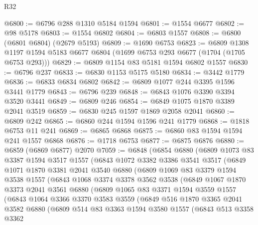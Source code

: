 \begin{lexlean}{R32}
\begin{coremodule}
@6800 := @6796 @288 @1310 @5184 @1594
@6801 := @1554 @6677
@6802 := @98 @5178
@6803 := @1554 @6802
@6804 := @6803 @1557
@6808 := @6800 (@6801 @6804) (@2679 @5193)
@6809 := @1690 @6753
@6823 := @6809
    @1308
    @1197
    @1594
    @5183
    @6677
    @6804
    (@1699 @6753 @293 @6677 (@1704 (@1705 @6753 @293)))
@6829 := @6809 @1154 @83 @5181 @1594 @6802 @1557
@6830 := @6796 @237
@6833 := @6830 @1153 @5175 @5180
@6834 := @3442 @1779
@6836 := @6833 @6834 @6802
@6842 := @6809 @1077 @244 @3395 @1596 @3441 @1779
@6843 := @6796 @239
@6848 := @6843 @1076 @3390 @3394 @3520 @3441
@6849 := @6809 @246
@6854 := @6849 @1075 @1870 @3389 @2041 @3519
@6859 := @6830 @245 @1597 @1869 @2058 @2041
@6860 := @6809 @242
@6865 := @6860 @244 @1594 @1596 @241 @1779
@6868 := @1818 @6753 @11 @241
@6869 := @6865 @6868
@6875 := @6860 @83 @1594 @1594 @241 @1557 @6868
@6876 := @1718 @6753
@6877 := @6875 @6876
@6880 := @6859 (@6869 @6877) @2070
@7059 := @6848
    (@6854
      @6880
      (@6809
        @1073
        @83
        @3387
        @1594
        @3517
        @1557
        (@6843
          @1072
          @3382
          @3386
          @3541
          @3517
          (@6849
            @1071
            @1870
            @3381
            @2041
            @3540
            @6880
            (@6809
              @1069
              @83
              @3379
              @1594
              @3538
              @1557
              (@6843
                @1068
                @3374
                @3378
                @3562
                @3538
                (@6849
                  @1067
                  @1870
                  @3373
                  @2041
                  @3561
                  @6880
                  (@6809
                    @1065
                    @83
                    @3371
                    @1594
                    @3559
                    @1557
                    (@6843
                      @1064
                      @3366
                      @3370
                      @3583
                      @3559
                      (@6849
                        @516
                        @1870
                        @3365
                        @2041
                        @3582
                        @6880
                        (@6809
                          @514
                          @83
                          @3363
                          @1594
                          @3580
                          @1557
                          (@6843
                            @513
                            @3358
                            @3362

\end{coremodule}
\end{lexlean}
